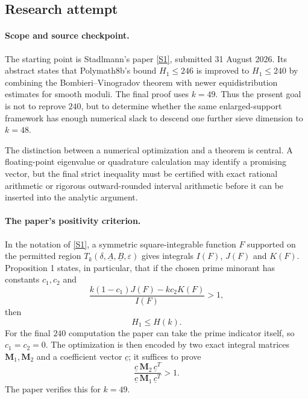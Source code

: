 \documentclass[11pt]{article}
\begin{document}
\subsection{Research attempt}

\paragraph{Scope and source checkpoint.}
The starting point is Stadlmann's paper \href{https://arxiv.org/abs/2608.31126}{[S1]}, submitted 31 August 2026.  Its abstract states that Polymath8b's bound $H_1\le246$ is improved to $H_1\le240$ by combining the Bombieri--Vinogradov theorem with newer equidistribution estimates for smooth moduli.  The final proof uses $k=49$.  Thus the present goal is not to reprove $240$, but to determine whether the same enlarged-support framework has enough numerical slack to descend one further sieve dimension to $k=48$.

The distinction between a numerical optimization and a theorem is central.  A floating-point eigenvalue or quadrature calculation may identify a promising vector, but the final strict inequality must be certified with exact rational arithmetic or rigorous outward-rounded interval arithmetic before it can be inserted into the analytic argument.

\paragraph{The paper's positivity criterion.}
In the notation of \href{https://arxiv.org/abs/2608.31126}{[S1]}, a symmetric square-integrable function $F$ supported on the permitted region $T_k(\delta,\underline A,\underline B,\varepsilon)$ gives integrals $I(F)$, $J(F)$ and $K(F)$.  Proposition 1 states, in particular, that if the chosen prime minorant has constants $c_1,c_2$ and
\begin{equation}\label{eq:stadlmann-criterion}
 \frac{k(1-c_1)J(F)-kc_2K(F)}{I(F)}>1,
\end{equation}
then
\[
 H_1\le H(k).
\]
For the final $240$ computation the paper can take the prime indicator itself, so $c_1=c_2=0$.  The optimization is then encoded by two exact integral matrices $\mathbf M_1,\mathbf M_2$ and a coefficient vector $\underline c$; it suffices to prove
\begin{equation}\label{eq:matrix-criterion}
 \frac{\underline c\,\mathbf M_2\,\underline c^T}
      {\underline c\,\mathbf M_1\,\underline c^T}>1.
\end{equation}
The paper verifies this for $k=49$.
\end{document}
